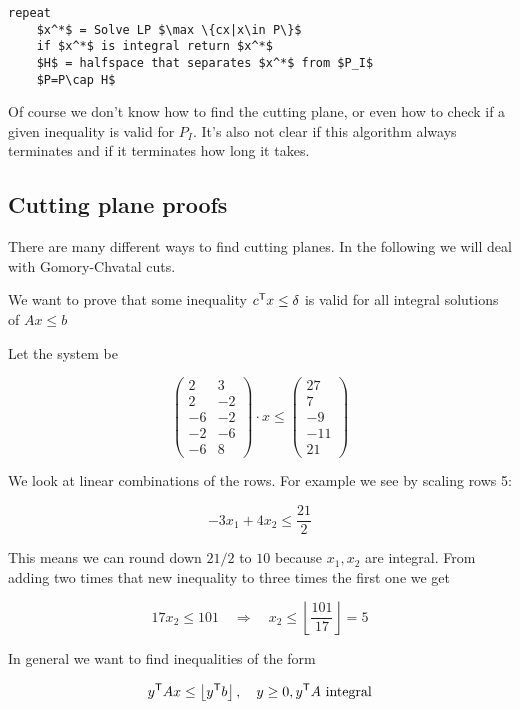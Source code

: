 \begin{lstlisting}
repeat
	$x^*$ = Solve LP $\max \{cx|x\in P\}$
	if $x^*$ is integral return $x^*$
	$H$ = halfspace that separates $x^*$ from $P_I$
	$P=P\cap H$
\end{lstlisting}

Of course we don't know how to find the cutting plane, or even how to check if a given inequality is valid for $P_I$. It's also not clear if this algorithm always terminates and if it terminates how long it takes.

\subsection{Cutting plane proofs}

There are many different ways to find cutting planes. In the following we will deal with Gomory-Chvatal cuts.

We want to prove that some inequality ${c}^\text{\upshape \sffamily T}x\leq \delta$ is valid for all integral solutions of $Ax\leq b$

\begin{Ex}
Let the system be

\[\begin{pmatrix}
2 & 3\\
2 & -2 \\
-6 & -2\\
-2 & -6\\
-6 & 8
\end{pmatrix}\cdot x \leq \begin{pmatrix} 27\\7\\-9\\-11\\21\end{pmatrix}\]

We look at linear combinations of the rows. For example we see by scaling rows 5:

\[-3x_1+4x_2 \leq \frac{21}{2}\]

This means we can round down $21/2$ to $10$ because $x_1,x_2$ are integral. From adding two times that new inequality to three times the first one we get

\[17x_2 \leq 101 \quad \Rightarrow \quad x_2 \leq \left\lfloor \frac{101}{17}\right\rfloor = 5\]
\end{Ex}

In general we want to find inequalities of the form

\[{y}^\text{\upshape \sffamily T} A x \leq \left\lfloor {y}^\text{\upshape \sffamily T} b \right \rfloor,\quad y\geq 0, {y}^\text{\upshape \sffamily T} A \text{ integral}\]

